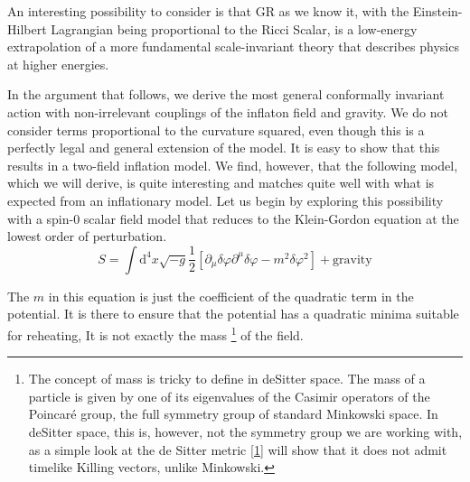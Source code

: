 \documentclass[aps,prd,reprint,preprintnumbers,showpacs,floatfix,nofootinbib,superscript address]{revtex4-2}
\begin{document}
An interesting possibility to consider is that GR as we know it, with the Einstein-Hilbert Lagrangian being proportional to the Ricci Scalar, is a low-energy extrapolation of a more fundamental scale-invariant theory that describes physics at higher energies. 

In the argument that follows, we derive the most general conformally invariant action with non-irrelevant couplings of the inflaton field and gravity. We do not consider terms proportional to the curvature squared, even though this is a perfectly legal and general extension of the model. It is easy to show that this results in a two-field inflation model. We find, however, that the following model, which we will derive, is quite interesting and matches quite well with what is expected from an inflationary model. Let us begin by exploring this possibility with a spin-0 scalar field model that reduces to the Klein-Gordon equation at the lowest order of perturbation.
\begin{equation} \label{25}
    S = \int \mathrm{d}^4 x \sqrt{-g} \frac{1}{2} \left[ \partial_\mu \delta \varphi \partial^\mu \delta \varphi - m^2   \delta\varphi^2   \right] + \text{gravity}
\end{equation}

The $m$ in this equation is just the coefficient of the quadratic term in the potential. It is there to ensure that the potential has a quadratic minima suitable for reheating, It is not exactly the mass \footnote{The concept of mass is tricky to define in deSitter space. The mass of a particle is given by one of its eigenvalues of the Casimir operators of the Poincaré group, the full symmetry group of standard Minkowski space. In deSitter space, this is, however, not the symmetry group we are working with, as a simple look at the de Sitter metric \ref{1} will show that it does not admit timelike Killing vectors, unlike Minkowski.} of the field.

\end{document}
